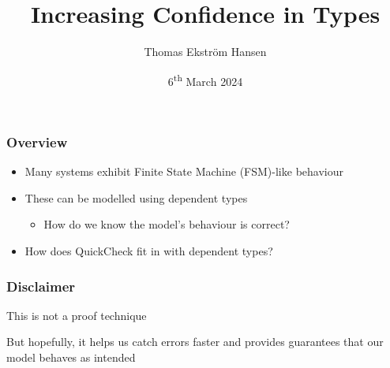 \documentclass[compress,handout]{beamer}
\title{Increasing Confidence in Types}
\author{Thomas Ekstr{\" o}m Hansen}
\date{6\textsuperscript{th} March 2024}
\begin{document}
\maketitle


\begin{frame}
  \frametitle{Overview}

  \begin{itemize}
    \item<1-> Many systems exhibit Finite State Machine (FSM)-like behaviour
    \item<2-> These can be modelled using dependent types
    \begin{itemize}
      \item<2-> How do we know the model's behaviour is correct?
    \end{itemize}
    \item<3-> How does QuickCheck fit in with dependent types?
  \end{itemize}

\end{frame}


\begin{frame}
  \frametitle{Disclaimer}

  \begin{center}
    {\large
    This is not a proof technique
    }

    {\normalsize
    But hopefully, it helps us catch errors faster and provides guarantees that
    our model behaves as intended
    }
  \end{center}

\end{frame}
\end{document}
